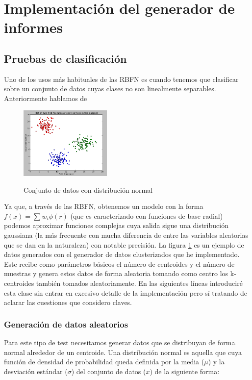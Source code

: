 \documentclass[10pt,a4paper]{report}
\begin{document}
\section{Implementación del generador de informes}



\subsection{Pruebas de clasificación}
Uno de los usos más habituales de las RBFN es cuando tenemos que clasificar sobre un conjunto de datos cuyas clases no son linealmente separables. Anteriormente hablamos de
\begin{figure}[!h]{}
    \centering
    \includegraphics[width=0.4\textwidth]{img/clusteredData1.png}
    \label{fig:clusteredData1}
    \caption{Conjunto de datos con distribución normal}
\end{figure}
Ya que, a través de las RBFN, obtenemos un modelo con la forma $f(x)=\sum w_{i}\phi(r)$ (que es caracterizado con funciones de base radial) podemos aproximar funciones complejas cuya salida sigue una distribución gaussiana (la más frecuente con mucha diferencia de entre las variables aleatorias que se dan en la naturaleza) con notable precisión. 
La figura \ref{fig:clusteredData1} es un ejemplo de datos generados con el generador de datos clusterizados que he implementado. Este recibe como parámetros básicos el número de centroides y el número de muestras y genera estos datos de forma aleatoria tomando como centro los k-centroides también tomados aleatoriamente. En las siguientes líneas introduciré esta clase sin entrar en excesivo detalle de la implementación pero sí tratando de aclarar las cuestiones que considero claves.

\subsubsection{Generación de datos aleatorios}
Para este tipo de test necesitamos generar datos que se distribuyan de forma normal alrededor de un centroide. Una distribución normal es aquella que cuya función de densidad de probabilidad queda definida por la media ($\mu$) y la desviación estándar ($\sigma$) del conjunto de datos ($x$) de la siguiente forma:
 
\end{document}
